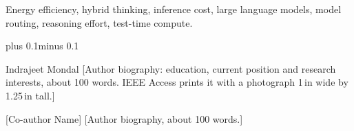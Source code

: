 \documentclass{ieeeaccess}
\makeatletter
\newif\ifextendedabstract
\renewcommand\maketitle{{\thispagestyle{titlepage}\@maketitle
    \vskip 0.3\baselineskip plus 0.1\baselineskip minus 0.1\baselineskip
    \vspace*{-1pt}\vspace*{-24pt}\par}}
\makeatother
\begin{document}
\begin{keywords}
Energy efficiency, hybrid thinking, inference cost, large language models,
model routing, reasoning effort, test-time compute.
\end{keywords}

\titlepgskip=-21pt

\maketitle

\ifextendedabstract\fi












\begin{IEEEbiographynophoto}{Indrajeet Mondal}
[Author biography: education, current position and research interests, about
100 words. IEEE Access prints it with a photograph 1\,in wide by 1.25\,in
tall.]
\end{IEEEbiographynophoto}

\begin{IEEEbiographynophoto}{[Co-author Name]}
[Author biography, about 100 words.]
\end{IEEEbiographynophoto}

\EOD
\end{document}
